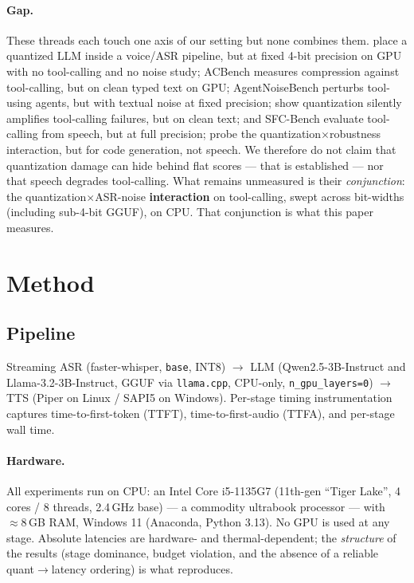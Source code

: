 \documentclass[11pt]{article}
\newcommand{\code}[1]{\texttt{#1}}
\begin{document}
\paragraph{Gap.} These threads each touch one axis of our setting but none combines
them. \citet{ethiraj2025} place a quantized LLM inside a voice/ASR pipeline, but at
fixed 4-bit precision on GPU with no tool-calling and no noise study; ACBench
\citep{dong2025} measures compression against tool-calling, but on clean typed text on
GPU; AgentNoiseBench \citep{wang2026} perturbs tool-using agents, but with textual
noise at fixed precision; \citet{jang2026} show quantization silently amplifies
tool-calling failures, but on clean text; \citet{laskar2026} and SFC-Bench
\citep{peng2026} evaluate tool-calling from speech, but at full precision;
\citet{fang2025} probe the quantization$\times$robustness interaction, but for code
generation, not speech. We therefore do not claim that quantization damage can hide
behind flat scores --- that is established --- nor that speech degrades tool-calling.
What remains unmeasured is their
\emph{conjunction}: the quantization$\times$ASR-noise \textbf{interaction} on
tool-calling, swept across bit-widths (including sub-4-bit GGUF), on CPU. That
conjunction is what this paper measures.

\section{Method}
\subsection{Pipeline}
Streaming ASR (faster-whisper, \code{base}, INT8) $\rightarrow$ LLM (Qwen2.5-3B-Instruct
and Llama-3.2-3B-Instruct, GGUF via \code{llama.cpp}, CPU-only, \code{n\_gpu\_layers=0})
$\rightarrow$ TTS (Piper on Linux / SAPI5 on Windows). Per-stage timing
instrumentation captures time-to-first-token (TTFT), time-to-first-audio (TTFA), and
per-stage wall time.

\paragraph{Hardware.} All experiments run on CPU: an Intel Core i5-1135G7 (11th-gen
``Tiger Lake'', 4 cores / 8 threads, 2.4\,GHz base) --- a commodity ultrabook
processor --- with ${\approx}8$\,GB RAM, Windows 11 (Anaconda, Python 3.13). No GPU is
used at any stage. Absolute latencies are hardware- and thermal-dependent; the
\emph{structure} of the results (stage dominance, budget violation, and the absence of
a reliable quant$\rightarrow$latency ordering) is what reproduces.
\end{document}
